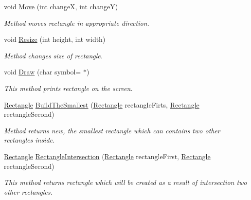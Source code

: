 \begin{DoxyCompactItemize}
void \mbox{\hyperlink{class_home_work_1_1_task_library_1_1_tasks_1_1_lesson6_1_1_task1_1_1_classes_1_1_rectangle_a3a9c55df66d8df0cf0d356b483f0b26a}{Move}} (int changeX, int changeY)
\begin{DoxyCompactList}\small\item\em Method moves rectangle in appropriate direction. \end{DoxyCompactList}\item 
void \mbox{\hyperlink{class_home_work_1_1_task_library_1_1_tasks_1_1_lesson6_1_1_task1_1_1_classes_1_1_rectangle_a84e67739744220cb808f5c679cd7bde0}{Resize}} (int height, int width)
\begin{DoxyCompactList}\small\item\em Method changes size of rectangle. \end{DoxyCompactList}\item 
void \mbox{\hyperlink{class_home_work_1_1_task_library_1_1_tasks_1_1_lesson6_1_1_task1_1_1_classes_1_1_rectangle_a8758f1f1f0fe9ba75f859aff3e1e39cf}{Draw}} (char symbol=\textquotesingle{} $\ast$\textquotesingle{})
\begin{DoxyCompactList}\small\item\em This method prints rectangle on the screen. \end{DoxyCompactList}\item 
\mbox{\hyperlink{class_home_work_1_1_task_library_1_1_tasks_1_1_lesson6_1_1_task1_1_1_classes_1_1_rectangle}{Rectangle}} \mbox{\hyperlink{class_home_work_1_1_task_library_1_1_tasks_1_1_lesson6_1_1_task1_1_1_classes_1_1_rectangle_a8729686f31d0d3d129c02a0128cbe00f}{Build\+The\+Smallest}} (\mbox{\hyperlink{class_home_work_1_1_task_library_1_1_tasks_1_1_lesson6_1_1_task1_1_1_classes_1_1_rectangle}{Rectangle}} rectangle\+Firts, \mbox{\hyperlink{class_home_work_1_1_task_library_1_1_tasks_1_1_lesson6_1_1_task1_1_1_classes_1_1_rectangle}{Rectangle}} rectangle\+Second)
\begin{DoxyCompactList}\small\item\em Method returns new, the smallest rectangle which can contains two other rectangles inside. \end{DoxyCompactList}\item 
\mbox{\hyperlink{class_home_work_1_1_task_library_1_1_tasks_1_1_lesson6_1_1_task1_1_1_classes_1_1_rectangle}{Rectangle}} \mbox{\hyperlink{class_home_work_1_1_task_library_1_1_tasks_1_1_lesson6_1_1_task1_1_1_classes_1_1_rectangle_a540b2bede0e35e5144af2439abacb469}{Rectangle\+Intersection}} (\mbox{\hyperlink{class_home_work_1_1_task_library_1_1_tasks_1_1_lesson6_1_1_task1_1_1_classes_1_1_rectangle}{Rectangle}} rectangle\+First, \mbox{\hyperlink{class_home_work_1_1_task_library_1_1_tasks_1_1_lesson6_1_1_task1_1_1_classes_1_1_rectangle}{Rectangle}} rectangle\+Second)
\begin{DoxyCompactList}\small\item\em This method returns rectangle which will be created as a result of intersection two other rectangles. \end{DoxyCompactList}\end{DoxyCompactItemize}
